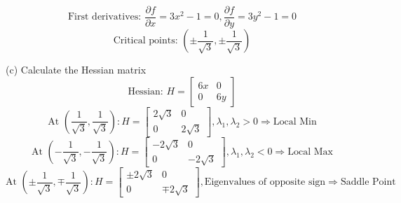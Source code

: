 \documentclass{article} %
\begin{document}
{    \[ \text{First derivatives: }
    \frac{\partial f}{\partial x} = 3x^2 - 1=0, 
    \frac{\partial f}{\partial y} = 3y^2 - 1=0 \]
    \[ \text{Critical points: }
    \left( \pm \frac{1}{\sqrt{3}}, \pm \frac{1}{\sqrt{3}} \right) \]

    \noindent (c) Calculate the Hessian matrix \\

    \[ \text{Hessian: }
    H = \begin{bmatrix}
    6x & 0 \\
    0 & 6y
    \end{bmatrix} \]
    \[ \text{At } \left( \frac{1}{\sqrt{3}}, \frac{1}{\sqrt{3}} \right):
    H = \begin{bmatrix} 2\sqrt{3} & 0 \\ 0 & 2\sqrt{3} \end{bmatrix}, \lambda_1,\lambda_2 > 0 \Rightarrow \text{Local Min} \]
    \[ \text{At } \left( -\frac{1}{\sqrt{3}}, -\frac{1}{\sqrt{3}} \right):
    H = \begin{bmatrix} -2\sqrt{3} & 0 \\ 0 & -2\sqrt{3} \end{bmatrix}, \lambda_1,\lambda_2 < 0 \Rightarrow \text{Local Max} \]
    \[ \text{At } \left( \pm \frac{1}{\sqrt{3}}, \mp \frac{1}{\sqrt{3}} \right): 
    H = \begin{bmatrix} \pm 2\sqrt{3} & 0 \\ 0 & \mp 2\sqrt{3} \end{bmatrix}, \text{Eigenvalues of opposite sign} \Rightarrow \text{Saddle Point} \]

}
\end{document}
